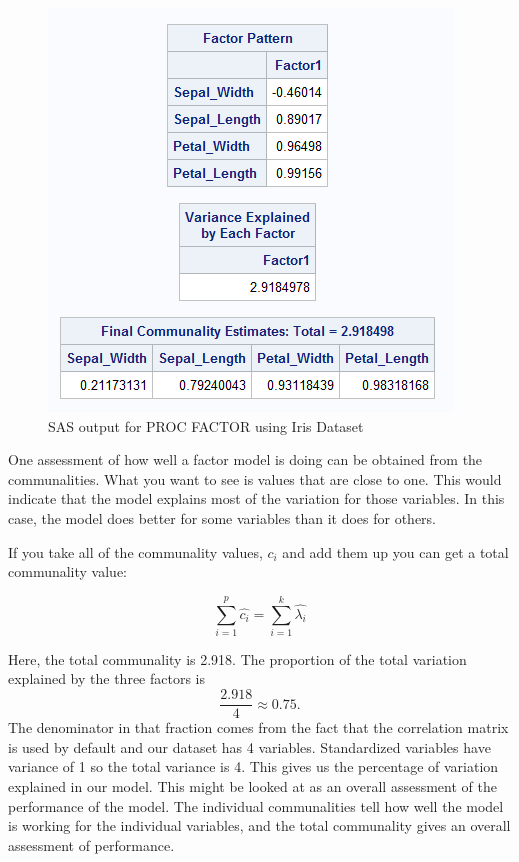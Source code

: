 \documentclass[
]{article}
\theoremstyle{definition}
\theoremstyle{definition}
\theoremstyle{definition}
\theoremstyle{definition}
\theoremstyle{remark}
\begin{document}
\begin{figure}

{\centering \includegraphics[width=1\linewidth]{figs/factorOUT} 

}

\caption{SAS output for PROC FACTOR using Iris Dataset}\label{fig:unnamed-chunk-126}
\end{figure}

One assessment of how well a factor model is doing can be obtained from the communalities. What you want to see is values that are close to one. This would indicate that the model explains most of the variation for those variables. In this case, the model does better for some variables than it does for others.

If you take all of the communality values, \(c_i\) and add them up you can get a total communality value:

\[\sum_{i=1}^p \widehat{c_i} = \sum_{i=1}^k \widehat{\lambda_i}\]

Here, the total communality is 2.918. The proportion of the total variation explained by the three factors is
\[\frac{2.918}{4}\approx 0.75.\]
The denominator in that fraction comes from the fact that the correlation matrix is used by default and our dataset has 4 variables. Standardized variables have variance of 1 so the total variance is 4. This gives us the percentage of variation explained in our model. This might be looked at as an overall assessment of the performance of the model. The individual communalities tell how well the model is working for the individual variables, and the total communality gives an overall assessment of performance.
\end{document}
